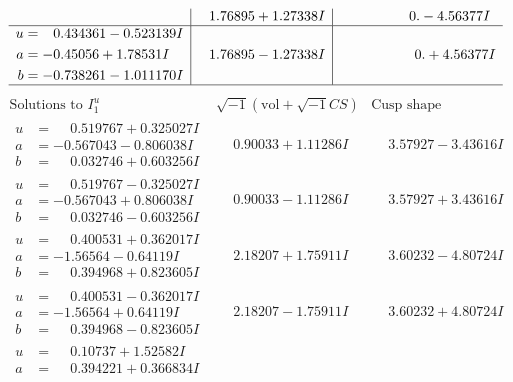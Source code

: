 \documentclass[1p]{elsarticle_modified}
\theoremstyle{definition}
\newcommand{\I}{\sqrt{-1}}
\begin{document}
$$\begin{array}{c|c|c}
 & \phantom{-}1.76895 + 1.27338 I & \phantom{-0.000000 } 0. - 4.56377 I \\ \hline\begin{aligned}
u &= \phantom{-}0.434361 - 0.523139 I \\
a &= -0.45056 + 1.78531 I \\
b &= -0.738261 - 1.011170 I\end{aligned}
 & \phantom{-}1.76895 - 1.27338 I & \phantom{-0.000000 -}0. + 4.56377 I\\
 \hline 
 \end{array}$$\newpage$$\begin{array}{c|c|c}  
\text{Solutions to }I^u_{1}& \I (\text{vol} + \sqrt{-1}CS) & \text{Cusp shape}\\
 \hline 
\begin{aligned}
u &= \phantom{-}0.519767 + 0.325027 I \\
a &= -0.567043 - 0.806038 I \\
b &= \phantom{-}0.032746 + 0.603256 I\end{aligned}
 & \phantom{-}0.90033 + 1.11286 I & \phantom{-}3.57927 - 3.43616 I \\ \hline\begin{aligned}
u &= \phantom{-}0.519767 - 0.325027 I \\
a &= -0.567043 + 0.806038 I \\
b &= \phantom{-}0.032746 - 0.603256 I\end{aligned}
 & \phantom{-}0.90033 - 1.11286 I & \phantom{-}3.57927 + 3.43616 I \\ \hline\begin{aligned}
u &= \phantom{-}0.400531 + 0.362017 I \\
a &= -1.56564 - 0.64119 I \\
b &= \phantom{-}0.394968 + 0.823605 I\end{aligned}
 & \phantom{-}2.18207 + 1.75911 I & \phantom{-}3.60232 - 4.80724 I \\ \hline\begin{aligned}
u &= \phantom{-}0.400531 - 0.362017 I \\
a &= -1.56564 + 0.64119 I \\
b &= \phantom{-}0.394968 - 0.823605 I\end{aligned}
 & \phantom{-}2.18207 - 1.75911 I & \phantom{-}3.60232 + 4.80724 I \\ \hline\begin{aligned}
u &= \phantom{-}0.10737 + 1.52582 I \\
a &= \phantom{-}0.394221 + 0.366834 I \\

\end{aligned}
\end{array}$$
\end{document}
